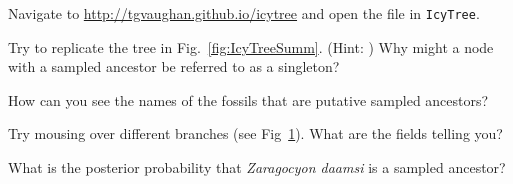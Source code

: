 {\begin{framed}
Navigate to \url{http://tgvaughan.github.io/icytree} and open the file  in {\tt IcyTree}.

\QUEST Try to replicate the tree in Fig.\ \ref{fig:IcyTreeSumm}. (Hint: )
Why might a node with a sampled ancestor be referred to as a singleton? 

\QUEST How can you see the names of the fossils that are putative sampled ancestors?

\QUEST Try mousing over different branches (see Fig\ \ref{fig:IcyTreeScreenshort}).
What are the fields telling you?

\QUEST What is the posterior probability that \textit{Zaragocyon daamsi} is a sampled ancestor?
\end{framed}}





\begin{figure}[h!]
\label{fig:IcyTreeScreenshort}
\end{figure}






